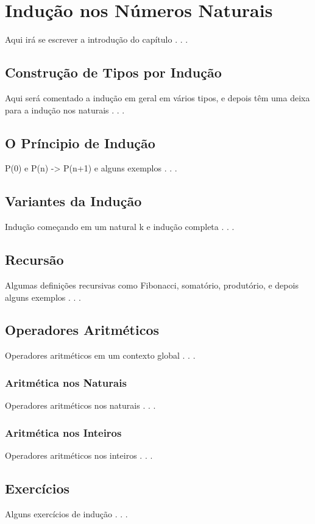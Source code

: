 \chapter{Indução nos Números Naturais}

Aqui irá se escrever a introdução do capítulo . . . 

\section{Construção de Tipos por Indução}

Aqui será comentado a indução em geral em vários tipos, e depois têm uma deixa para a indução nos naturais . . .

\section{O Príncipio de Indução}

P(0) e P(n) -> P(n+1) e alguns exemplos . . .

\section{Variantes da Indução}

Indução começando em um natural k e indução completa . . .

\section{Recursão}

Algumas definições recursivas como Fibonacci, somatório, produtório, e depois alguns exemplos . . .

\section{Operadores Aritméticos}

Operadores aritméticos em um contexto global . . .

\subsection{Aritmética nos Naturais}

Operadores aritméticos nos naturais . . .

\subsection{Aritmética nos Inteiros}

Operadores aritméticos nos inteiros . . .

\section{Exercícios}

Alguns exercícios de indução . . .